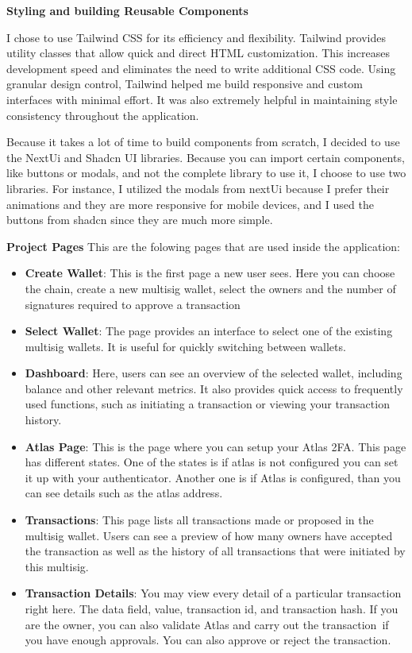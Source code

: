 \par \textbf{Styling and building Reusable Components}
\par I chose to use Tailwind CSS for its efficiency and flexibility. Tailwind provides utility classes that allow quick and direct HTML customization. This increases development speed and eliminates the need to write additional CSS code. Using granular design control, Tailwind helped me build responsive and custom interfaces with minimal effort. It was also extremely helpful in maintaining style consistency throughout the application. 
\par Because it takes a lot of time to build components from scratch, I decided to use the NextUi and Shadcn UI libraries. Because you can import certain components, like buttons or modals, and not the complete library to use it, I choose to use two libraries. For instance, I utilized the modals from nextUi because I prefer their animations and they are more responsive for mobile devices, and I used the buttons from shadcn since they are much more simple. 
\par \textbf{Project Pages}
This are the folowing pages that are used inside the application:
\begin{itemize}
	\item \textbf{Create Wallet}: This is the first page a new user sees. Here you can choose the chain, create a new multisig wallet, select the owners and the number of signatures required to approve a transaction
	\item \textbf{Select Wallet}: The page provides an interface to select one of the existing multisig wallets. It is useful for quickly switching between wallets.
	\item \textbf{Dashboard}: Here, users can see an overview of the selected wallet, including balance and other relevant metrics. It also provides quick access to frequently used functions, such as initiating a transaction or viewing your transaction history.
	\item \textbf{Atlas Page}: This is the page where you can setup your Atlas 2FA. This page has different states. One of the states is if atlas is not configured you can set it up with your authenticator. Another one is if Atlas is configured, than you can see details such as the atlas address.
	\item \textbf{Transactions}: This page lists all transactions made or proposed in the multisig wallet. Users can see a preview of how many owners have accepted the transaction as well as the history of all transactions that were initiated by this multisig.
	\item \textbf{Transaction Details}: You may view every detail of a particular transaction right here. The data field, value, transaction id, and transaction hash. If you are the owner, you can also validate Atlas and carry out the transaction if you have enough approvals. You can also approve or reject the transaction.
\end{itemize}

